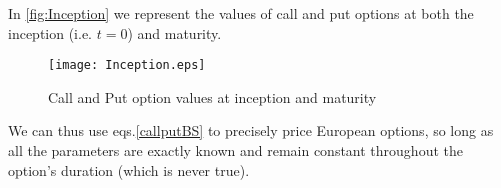 In \autoref{fig:Inception} we represent the values of call and put options at both the inception (i.e. $t=0$) and maturity.
\begin{figure}[H]
    \centering
      \texttt{[image: Inception.eps]}
      \caption{Call and Put option values at inception and maturity}\label{fig:Inception}
    \end{figure}

We can thus use eqs.\eqref{callputBS} to precisely price European options, so long as all the parameters are exactly known and remain constant throughout the option's duration (which is never true).
